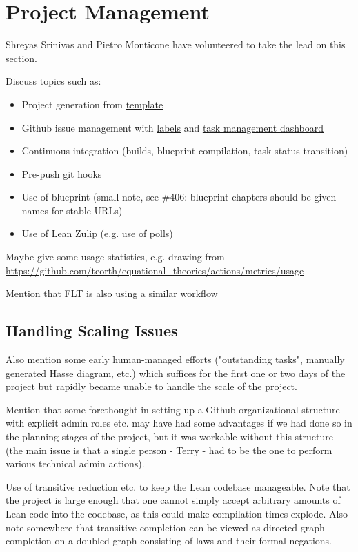
\section{Project Management}\label{project-sec}


Shreyas Srinivas and Pietro Monticone have volunteered to take the lead on this section.

Discuss topics such as:
\begin{itemize}
    \item Project generation from \href{https://github.com/pitmonticone/LeanProject}{template}
    \item Github issue management with \href{https://github.com/teorth/equational_theories/labels}{labels} and \href{https://github.com/users/teorth/projects/1}{task management dashboard}
    \item Continuous integration (builds, blueprint compilation, task status transition)
    \item Pre-push git hooks
    \item Use of blueprint (small note, see \#406: blueprint chapters should be given names for stable URLs)
    \item Use of Lean Zulip (e.g. use of polls)
\end{itemize}

Maybe give some usage statistics, e.g. drawing from \url{https://github.com/teorth/equational_theories/actions/metrics/usage}

Mention that FLT is also using a similar workflow

\subsection{Handling Scaling Issues}

Also mention some early human-managed efforts ("outstanding tasks", manually generated Hasse diagram, etc.) which suffices for the first one or two days of the project but rapidly became unable to handle the scale of the project.

Mention that some forethought in setting up a Github organizational structure with explicit admin roles etc. may have had some advantages if we had done so in the planning stages of the project, but it was workable without this structure (the main issue is that a single person - Terry - had to be the one to perform various technical admin actions).

Use of transitive reduction etc. to keep the Lean codebase manageable. Note that the project is large enough that one cannot simply accept arbitrary amounts of Lean code into the codebase, as this could make compilation times explode. Also note somewhere that transitive completion can be viewed as directed graph completion on a doubled graph consisting of laws and their formal negations.

